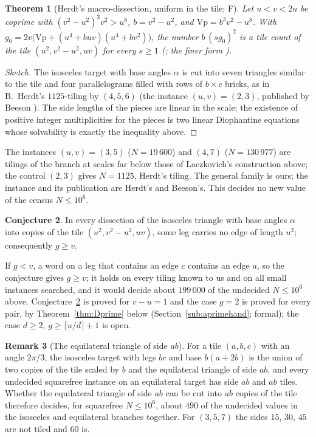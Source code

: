 \documentclass[11pt,reqno]{amsart}
\theoremstyle{plain}
\newtheorem{theorem}{Theorem}[section]
\theoremstyle{definition}
\newtheorem{remark}[theorem]{Remark}
\newtheorem{conjecture}[theorem]{Conjecture}
\newcommand{\sF}{\textup{\textsf{F}}}
\begin{document}
\begin{theorem}[Herdt's macro-dissection, uniform in the tile; \sF]\label{thm:herdt}
Let $u<v<2u$ be coprime with $(v^2-u^2)^3v^2>u^8$, $b=v^2-u^2$, and $\mathrm{Vp}=b^3v^2-u^8$. With
$g_0=2v\bigl(\mathrm{Vp}+(u^4+buv)(u^4+bv^2)\bigr)$, the number $b\,(s g_0)^2$ is a tile count of the tile
$(u^2,v^2-u^2,uv)$ for every $s\ge1$ (; the finer form ).
\end{theorem}
\begin{proof}[Sketch]
The isosceles target with base angles $\alpha$ is cut into seven triangles similar to the tile and four parallelograms
filled with rows of $b\times c$ bricks, as in B.~Herdt's $1125$-tiling by $(4,5,6)$ (the instance $(u,v)=(2,3)$, published
by Beeson \cite{BeesonIso}). The side lengths of the pieces are linear in the scale; the existence of positive integer
multiplicities for the pieces is two linear Diophantine equations whose solvability is exactly the inequality above.
\end{proof}
The instances $(u,v)=(3,5)$ ($N=19\,600$) and $(4,7)$ ($N=130\,977$) are tilings of the branch at scales far below those
of Laczkovich's construction above; the control $(2,3)$ gives $N=1125$, Herdt's tiling. The general family is ours;
the instance and its publication are Herdt's and Beeson's. This decides no new value of the census $N\le10^6$.

\begin{conjecture}\label{conj:aprime}
In every dissection of the isosceles triangle with base angles $\alpha$ into copies of the tile
$(u^2,v^2-u^2,uv)$, some leg carries no edge of length $u^2$; consequently $g\ge v$.
\end{conjecture}

\noindent If $g<v$, a word on a leg that contains an edge $c$ contains an edge $a$, so the conjecture gives $g\ge v$; it
holds on every tiling known to us and on all small instances searched, and it would decide about $199\,000$ of the
undecided $N\le10^6$ above. Conjecture~\ref{conj:aprime} is proved for $v-u=1$ and the case $g=2$ is proved for every pair, by Theorem~\ref{thm:Dprime} below (Section~\ref{sub:aprimehand}; formal); the case $d\ge2$, $g\ge\lceil u/d\rceil+1$ is open.

\begin{remark}[The equilateral triangle of side $ab$]\label{rem:eqgate}
For a tile $(a,b,c)$ with an angle $2\pi/3$, the isosceles target with legs $bc$ and base $b(a+2b)$ is the union of two
copies of the tile scaled by $b$ and the equilateral triangle of side $ab$, and every undecided squarefree instance on
an equilateral target has side $ab$ and $ab$ tiles. Whether the equilateral triangle of side $ab$ can be cut into $ab$
copies of the tile therefore decides, for squarefree $N\le10^6$, about $490$ of the undecided values in the isosceles
and equilateral branches together. For $(3,5,7)$ the sides $15$, $30$, $45$ are not tiled and $60$ is.
\end{remark}
\end{document}
